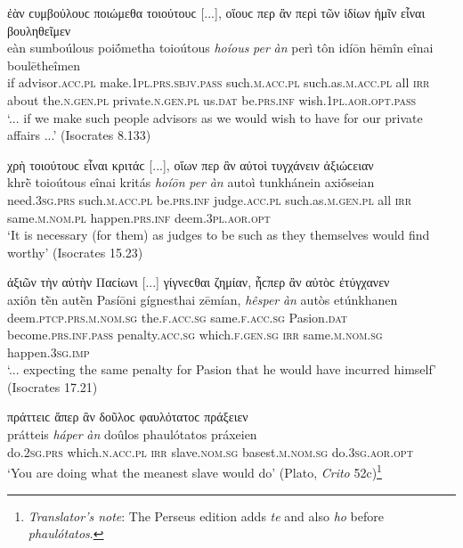 \begin{exe}
\ex ἐὰν ϲυμβούλουϲ ποιώμεθα τοιούτουϲ {[}...{]}, οἵουϲ περ ἂν περὶ τῶν ἰδίων ἡμῖν εἶναι βουληθεῖμεν\\
\gll eàn sumboúlous poiṓmetha toioútous \emph{hoíous} \emph{per} \emph{àn} perì tôn idíōn hēmîn eînai boulētheîmen\\
if advisor.\textsc{acc.pl} make.\textsc{1pl.prs.sbjv.pass} such.\textsc{m.acc.pl} such.as.\textsc{m.acc.pl} all \textsc{irr} about the.\textsc{n.gen.pl} private.\textsc{n.gen.pl} us.\textsc{dat} be.\textsc{prs.inf} wish.\textsc{1pl.aor.opt.pass}\\
\trans `... if we make such people advisors as we would wish to have for our private affairs ...' (Isocrates 8.133)
\label{relan50}
\end{exe}

\begin{exe}
\ex χρὴ τοιούτουϲ εἶναι κριτάϲ {[}...{]}, οἵων περ ἂν αὐτοὶ τυγχάνειν ἀξιώϲειαν\\
\gll khrḕ toioútous eînai kritás \emph{hoíōn} \emph{per} \emph{àn} autoì tunkhánein axiṓseian\\
need.\textsc{3sg.prs} such.\textsc{m.acc.pl} be.\textsc{prs.inf} judge.\textsc{acc.pl} such.as.\textsc{m.gen.pl} all \textsc{irr} same.\textsc{m.nom.pl} happen.\textsc{prs.inf} deem.\textsc{3pl.aor.opt}\\
\trans `It is necessary (for them) as judges to be such as they themselves would find worthy' (Isocrates 15.23)
\label{relan51}
\end{exe}

\begin{exe}
\ex ἀξιῶν τὴν αὐτὴν Παϲίωνι {[}...{]} γίγνεϲθαι ζημίαν, ἧϲπερ ἂν αὐτὸϲ ἐτύγχανεν\\
\gll axiôn tḕn autḕn Pasíōni gígnesthai zēmían, \emph{hêsper} \emph{àn} autòs etúnkhanen\\
deem.\textsc{ptcp.prs.m.nom.sg} the.\textsc{f.acc.sg} same.\textsc{f.acc.sg} Pasion.\textsc{dat} become.\textsc{prs.inf.pass} penalty.\textsc{acc.sg}
which.\textsc{f.gen.sg} \textsc{irr} same.\textsc{m.nom.sg} happen.\textsc{3sg.imp}\\
\trans `... expecting the same penalty for Pasion that he would have incurred himself' (Isocrates 17.21)
\label{relan52}
\end{exe}

\begin{exe}
\ex πράττειϲ ἅπερ ἂν δοῦλοϲ φαυλότατοϲ πράξειεν\\
\gll prátteis \emph{háper} \emph{àn} doûlos phaulótatos práxeien\\
do.\textsc{2sg.prs} which.\textsc{n.acc.pl} \textsc{irr} slave.\textsc{nom.sg} basest.\textsc{m.nom.sg} do.\textsc{3sg.aor.opt}\\
\trans `You are doing what the meanest slave would do' (Plato, \textit{Crito} 52c)\footnote{\emph{Translator's note}: The Perseus edition adds \textit{te} and also \textit{ho} before \textit{phaulótatos}.}
\label{relan53}
\end{exe}

